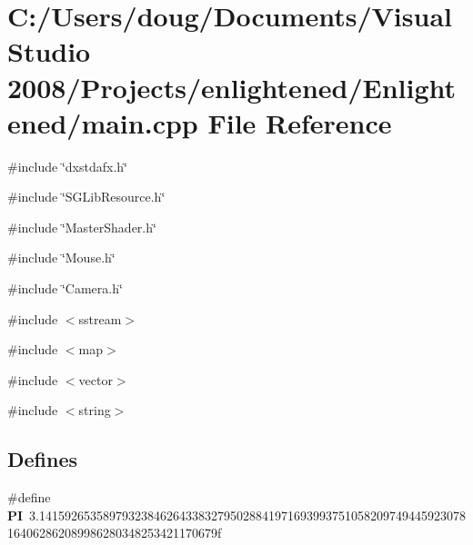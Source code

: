 \section{C:/Users/doug/Documents/Visual Studio 2008/Projects/enlightened/Enlightened/main.cpp File Reference}
\label{main_8cpp}
{\ttfamily \#include \char`\"{}dxstdafx.h\char`\"{}}\par
{\ttfamily \#include \char`\"{}SGLibResource.h\char`\"{}}\par
{\ttfamily \#include \char`\"{}MasterShader.h\char`\"{}}\par
{\ttfamily \#include \char`\"{}Mouse.h\char`\"{}}\par
{\ttfamily \#include \char`\"{}Camera.h\char`\"{}}\par
{\ttfamily \#include $<$sstream$>$}\par
{\ttfamily \#include $<$map$>$}\par
{\ttfamily \#include $<$vector$>$}\par
{\ttfamily \#include $<$string$>$}\par
\subsection*{Defines}
\begin{DoxyCompactItemize}
\item 
\#define {\bf PI}~3.1415926535897932384626433832795028841971693993751058209749445923078164062862089986280348253421170679f
\end{DoxyCompactItemize}
